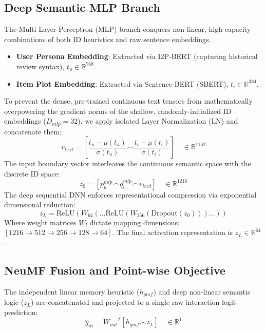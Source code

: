 \documentclass[11pt,a4paper]{article}
\begin{document}
\subsection{Deep Semantic MLP Branch}
The Multi-Layer Perceptron (MLP) branch conquers non-linear, high-capacity combinations of both ID heuristics and raw sentence embeddings.
\begin{itemize}
    \item \textbf{User Persona Embedding}: Extracted via I2P-BERT (capturing historical review syntax), $t_u \in \mathbb{R}^{768}$.
    \item \textbf{Item Plot Embedding}: Extracted via Sentence-BERT (SBERT), $t_i \in \mathbb{R}^{384}$.
\end{itemize}
To prevent the dense, pre-trained continuous text tensors from mathematically overpowering the gradient norms of the shallow, randomly-initialized ID embeddings ($D_{mlp}=32$), we apply isolated Layer Normalization ($\text{LN}$) and concatenate them:
\begin{equation}
    v_{text} = \left[\frac{t_u - \mu(t_u)}{\sigma(t_u)} \frown \frac{t_i - \mu(t_i)}{\sigma(t_i)} \right] \quad \in \mathbb{R}^{1152}
\end{equation}
The input boundary vector interleaves the continuous semantic space with the discrete ID space:
\begin{equation}
    z_0 = [p_u^{mlp} \frown q_i^{mlp} \frown v_{text}] \quad \in \mathbb{R}^{1216}
\end{equation}
The deep sequential DNN enforces representational compression via exponential dimensional reduction:
\begin{equation}
    z_L = \text{ReLU}(W_{64} (\ldots \text{ReLU}(W_{256} (\text{Dropout}(z_0))) \ldots ))
\end{equation}
Where weight matrices $W_l$ dictate mapping dimensions: $[1216 \rightarrow 512 \rightarrow 256 \rightarrow 128 \rightarrow 64]$. The final activation representation is $z_L \in \mathbb{R}^{64}$.

\subsection{NeuMF Fusion and Point-wise Objective}
The independent linear memory heuristic ($h_{gmf}$) and deep non-linear semantic logic ($z_L$) are concatenated and projected to a single raw interaction logit prediction:
\begin{equation}
    \hat{y}_{ui} = {W_{out}}^T [h_{gmf} \frown z_L] \quad \in \mathbb{R}^1
\end{equation}
\end{document}
